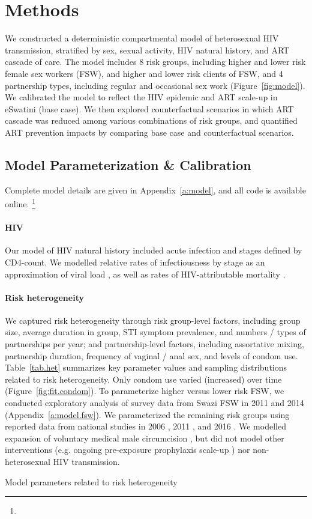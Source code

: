 \section{Methods}\label{meth}
We constructed a deterministic compartmental model of heterosexual HIV transmission,
stratified by sex, sexual activity, HIV natural history, and ART cascade of care.
The model includes 8 risk groups,
including higher and lower risk female sex workers (FSW), and higher and lower risk clients of FSW,
and 4 partnership types, including regular and occasional sex work (Figure~\ref{fig:model}).
We calibrated the model to reflect the HIV epidemic and ART scale-up in eSwatini (base case).
We then explored counterfactual scenarios in which
ART cascade was reduced among various combinations of risk groups,
and quantified ART prevention impacts by comparing base case and counterfactual scenarios.
\subsection{Model Parameterization \& Calibration}\label{meth.param}
Complete model details are given in Appendix~\ref{a:model},
and all code is available online.%
\footnote{}
\paragraph{HIV}
Our model of HIV natural history included acute infection and stages defined by CD4-count.
We modelled relative rates of infectiousness by stage
as an approximation of viral load \cite{Wawer2005,Boily2009,Donnell2010},
as well as rates of HIV-attributable mortality \cite{Badri2006,Anglaret2012,Mangal2017}.
\paragraph{Risk heterogeneity}
We captured risk heterogeneity through risk group-level factors, including
group size, average duration in group, STI symptom prevalence,
and numbers / types of partnerships per year;
and partnership-level factors, including
assortative mixing, partnership duration, frequency of vaginal / anal sex, and levels of condom use.
Table~\ref{tab.het} summarizes key parameter values and sampling distributions
related to risk heterogeneity.
Only condom use varied (increased) over time (Figure~\ref{fig:fit.condom}).
To parameterize higher versus lower risk FSW, we conducted exploratory analysis of
survey data from Swazi FSW in 2011 \cite{Baral2014} and 2014 \cite{EswKP2014} (Appendix~\ref{a:model.fsw}).
We parameterized the remaining risk groups using reported data from national studies in
2006 \cite{SDHS2006}, 2011 \cite{SHIMS1}, and 2016 \cite{SHIMS2}.
We modelled expansion of voluntary medical male circumcision \cite{SHIMS2},
but did not model other interventions (e.g. ongoing pre-exposure prophylaxis scale-up \cite{EswCOP21})
nor non-heterosexual HIV transmission.
\begin{table}
  \centering
  \caption{Model parameters related to risk heterogeneity}
  
  \label{tab.het}
\end{table}
